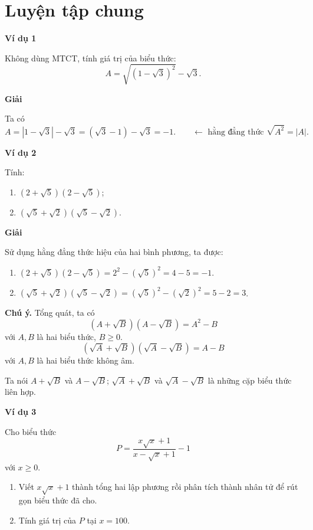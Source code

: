 
\section*{Luyện tập chung}

\begin{exercises}
    \textbf{Ví dụ 1}

    Không dùng MTCT, tính giá trị của biểu thức:
    \[
        A=\sqrt{(1-\sqrt{3})^2}-\sqrt{3}.
    \]

    \textbf{Giải}

    Ta có
    \[
        A=|1-\sqrt{3}|-\sqrt{3}=(\sqrt{3}-1)-\sqrt{3}=-1.
        \qquad \leftarrow \text{ hằng đẳng thức }\sqrt{A^2}=|A|.
    \]

    \textbf{Ví dụ 2}

    Tính:
    \begin{enumerate}[label=\alph*)]
        \item $(2+\sqrt{5})(2-\sqrt{5})$;
        \item $(\sqrt{5}+\sqrt{2})(\sqrt{5}-\sqrt{2})$.
    \end{enumerate}

    \textbf{Giải}

    Sử dụng hằng đẳng thức hiệu của hai bình phương, ta được:
    \begin{enumerate}[label=\alph*)]
        \item $(2+\sqrt{5})(2-\sqrt{5})=2^2-(\sqrt{5})^2=4-5=-1$.
        \item $(\sqrt{5}+\sqrt{2})(\sqrt{5}-\sqrt{2})=(\sqrt{5})^2-(\sqrt{2})^2=5-2=3$.
    \end{enumerate}

    \textbf{Chú ý.} Tổng quát, ta có
    \[
        (A+\sqrt{B})(A-\sqrt{B})=A^2-B
    \]
    với $A, B$ là hai biểu thức, $B\ge 0$.
    \[
        (\sqrt{A}+\sqrt{B})(\sqrt{A}-\sqrt{B})=A-B
    \]
    với $A, B$ là hai biểu thức không âm.

    Ta nói $A+\sqrt{B}$ và $A-\sqrt{B}$; $\sqrt{A}+\sqrt{B}$ và $\sqrt{A}-\sqrt{B}$ là những cặp biểu thức liên hợp.

    \textbf{Ví dụ 3}

    Cho biểu thức
    \[
        P=\dfrac{x\sqrt{x}+1}{x-\sqrt{x}+1}-1
    \]
    với $x\ge 0$.
    \begin{enumerate}[label=\alph*)]
        \item Viết $x\sqrt{x}+1$ thành tổng hai lập phương rồi phân tích thành nhân tử để rút gọn biểu thức đã cho.
        \item Tính giá trị của $P$ tại $x=100$.
    \end{enumerate}


\end{exercises}
